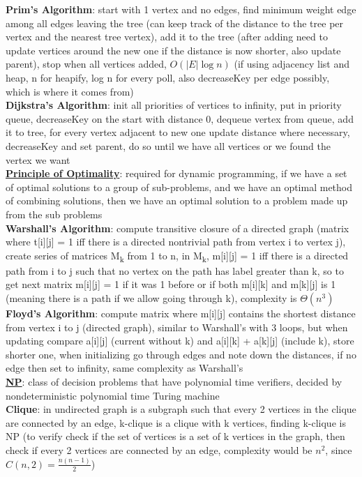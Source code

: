 \documentclass[a4paper]{article}
\begin{document}
\begin{multicols}{2}
        \textbf{Prim's Algorithm}: start with 1 vertex and no edges, find minimum weight edge among all edges leaving the tree (can keep track of the distance to the tree per vertex and the nearest tree vertex), add it to the tree (after adding need to update vertices around the new one if the distance is now shorter, also update parent), stop when all vertices added, $O(|E| \log n)$ (if using adjacency list and heap, n for heapify, log n for every poll, also decreaseKey per edge possibly, which is where it comes from)\\
        \textbf{Dijkstra's Algorithm}: init all priorities of vertices to infinity, put in priority queue, decreaseKey on the start with distance 0, dequeue vertex from queue, add it to tree, for every vertex adjacent to new one update distance where necessary, decreaseKey and set parent, do so until we have all vertices or we found the vertex we want\\
        \underline{\textbf{Principle of Optimality}}: required for dynamic programming, if we have a set of optimal solutions to a group of sub-problems, and we have an optimal method of combining solutions, then we have an optimal solution to a problem made up from the sub problems\\
        \textbf{Warshall's Algorithm}: compute transitive closure of a directed graph (matrix where t[i][j] = 1 iff there is a directed nontrivial path from vertex i to vertex j), create series of matrices M\textsubscript{k} from 1 to n, in M\textsubscript{k}, m[i][j] = 1 iff there is a directed path from i to j such that no vertex on the path has label greater than k, so to get next matrix m[i][j] = 1 if it was 1 before or if both m[i][k] and m[k][j] is 1 (meaning there is a path if we allow going through k), complexity is $\Theta (n^3)$\\
        \textbf{Floyd's Algorithm}: compute matrix where m[i][j] contains the shortest distance from vertex i to j (directed graph), similar to Warshall's with 3 loops, but when updating compare a[i][j] (current without k) and a[i][k] + a[k][j] (include k), store shorter one, when initializing go through edges and note down the distances, if no edge then set to infinity, same complexity as Warshall's\\
        \underline{\textbf{NP}}: class of decision problems that have polynomial time verifiers, decided by nondeterministic polynomial time Turing machine\\
        \textbf{Clique}: in undirected graph is a subgraph such that every 2 vertices in the clique are connected by an edge, k-clique is a clique with k vertices, finding k-clique is NP (to verify check if the set of vertices is a set of k vertices in the graph, then check if every 2 vertices are connected by an edge, complexity would be $n^2$, since $C(n, 2) = \frac{n(n-1)}{2}$)\\

\end{multicols}
\end{document}
